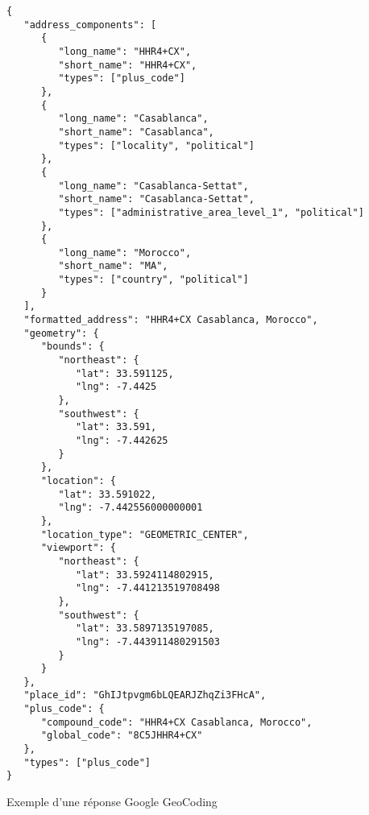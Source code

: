 \begin{code}
\begin{verbatim}
{
   "address_components": [
      {
         "long_name": "HHR4+CX",
         "short_name": "HHR4+CX",
         "types": ["plus_code"]
      },
      {
         "long_name": "Casablanca",
         "short_name": "Casablanca",
         "types": ["locality", "political"]
      },
      {
         "long_name": "Casablanca-Settat",
         "short_name": "Casablanca-Settat",
         "types": ["administrative_area_level_1", "political"]
      },
      {
         "long_name": "Morocco",
         "short_name": "MA",
         "types": ["country", "political"]
      }
   ],
   "formatted_address": "HHR4+CX Casablanca, Morocco",
   "geometry": {
      "bounds": {
         "northeast": {
            "lat": 33.591125,
            "lng": -7.4425
         },
         "southwest": {
            "lat": 33.591,
            "lng": -7.442625
         }
      },
      "location": {
         "lat": 33.591022,
         "lng": -7.442556000000001
      },
      "location_type": "GEOMETRIC_CENTER",
      "viewport": {
         "northeast": {
            "lat": 33.5924114802915,
            "lng": -7.441213519708498
         },
         "southwest": {
            "lat": 33.5897135197085,
            "lng": -7.443911480291503
         }
      }
   },
   "place_id": "GhIJtpvgm6bLQEARJZhqZi3FHcA",
   "plus_code": {
      "compound_code": "HHR4+CX Casablanca, Morocco",
      "global_code": "8C5JHHR4+CX"
   },
   "types": ["plus_code"]
}
\end{verbatim}
\caption{Exemple d'une réponse Google GeoCoding}
\end{code}